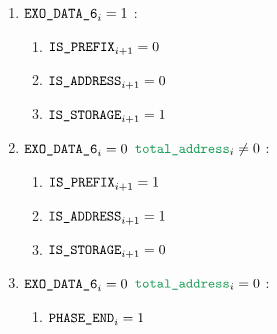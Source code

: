 \begin{enumerate}[resume]
\begin{enumerate}[resume]
\begin{enumerate}
					\item \If $\texttt{EXO\_DATA\_6}_{i} = 1$ \Then:
						\begin{enumerate}
							\item $\texttt{IS\_PREFIX} _{i+1} = 0$
							\item $\texttt{IS\_ADDRESS}   _{i+1} = 0$
							\item $\texttt{IS\_STORAGE}    _{i+1} = 1$
						\end{enumerate}

					\item \If $\texttt{EXO\_DATA\_6}_{i} = 0$ \et $\locTotNbOfAddress_{i} \neq 0$ \Then:
						\begin{enumerate}
							\item $\texttt{IS\_PREFIX} _{i+1} = 1$
							\item $\texttt{IS\_ADDRESS}   _{i+1} = 1$
							\item $\texttt{IS\_STORAGE}    _{i+1} = 0$
						\end{enumerate}

					\item \If $\texttt{EXO\_DATA\_6}_{i} = 0$ \et $\locTotNbOfAddress_{i} = 0$ \Then:
						\begin{enumerate}
							\item $\texttt{PHASE\_END} _{i} = 1$
						\end{enumerate}
				\end{enumerate}
		\end{enumerate}


\end{enumerate}
